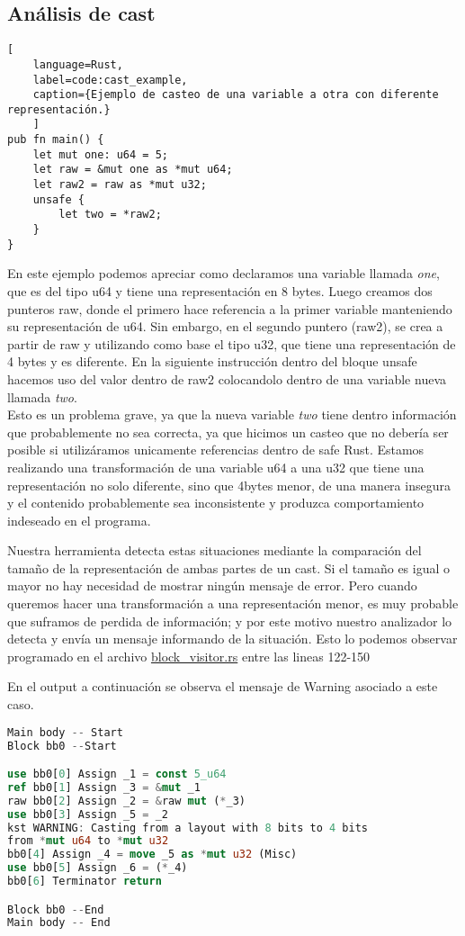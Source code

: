 \subsection{Análisis de cast}

\begin{lstlisting}[
    language=Rust,
    label=code:cast_example,
    caption={Ejemplo de casteo de una variable a otra con diferente representación.}
    ]
pub fn main() {
    let mut one: u64 = 5;
    let raw = &mut one as *mut u64;
    let raw2 = raw as *mut u32;
    unsafe {
        let two = *raw2;
    }
}
\end{lstlisting}

En este ejemplo podemos apreciar como declaramos una variable llamada \textit{one}, que es del tipo u64 y tiene una representación en 8 bytes.
Luego creamos dos punteros raw, donde el primero hace referencia a la primer variable manteniendo su representación de u64. Sin embargo,
en el segundo puntero (raw2), se crea a partir de raw y utilizando como base el tipo u32, que tiene una representación de 4 bytes y es diferente.
En la siguiente instrucción dentro del bloque unsafe hacemos uso del valor dentro de raw2 colocandolo dentro de una variable nueva llamada \textit{two}.\\
Esto es un problema grave, ya que la nueva variable \textit{two} tiene dentro información que probablemente no sea correcta, ya que hicimos un casteo
que no debería ser posible si utilizáramos unicamente referencias dentro de safe Rust. Estamos realizando una transformación de una variable u64
a una u32 que tiene una representación no solo diferente, sino que 4bytes menor, de una manera insegura y el contenido probablemente sea inconsistente
y produzca comportamiento indeseado en el programa.

Nuestra herramienta detecta estas situaciones mediante la comparación del tamaño de la representación de ambas partes de un cast. Si el tamaño es igual
o mayor no hay necesidad de mostrar ningún mensaje de error. Pero cuando queremos hacer una transformación a una representación menor, es muy probable
que suframos de perdida de información; y por este motivo nuestro analizador lo detecta y envía un mensaje informando de la situación. Esto lo podemos
observar programado en el archivo \href{run:../src/mir_visitor/block_visitor.rs}{block\_visitor.rs} entre las lineas 122-150

En el output a continuación se observa el mensaje de Warning asociado a este caso.

\begin{lstlisting}[language=rust]
Main body -- Start
Block bb0 --Start

use bb0[0] Assign _1 = const 5_u64
ref bb0[1] Assign _3 = &mut _1
raw bb0[2] Assign _2 = &raw mut (*_3)
use bb0[3] Assign _5 = _2
kst WARNING: Casting from a layout with 8 bits to 4 bits
from *mut u64 to *mut u32
bb0[4] Assign _4 = move _5 as *mut u32 (Misc)
use bb0[5] Assign _6 = (*_4)
bb0[6] Terminator return

Block bb0 --End
Main body -- End
\end{lstlisting}








